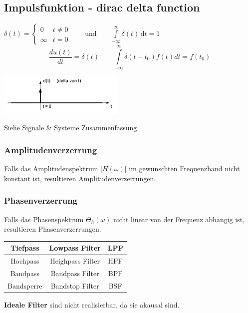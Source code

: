 \subsection{Impulsfunktion - dirac delta function}
	\begin{minipage}{10cm}
		$\delta (t)=\begin{cases} 0 & t\ne 0\\\infty & t=0\end{cases} \qquad
		\text{und} \qquad \int\limits_{-\infty}^\infty \delta(t) \, \mathrm dt = 1 $\\
		$$\frac{du(t)}{dt}=\delta(t) \qquad
		\int\limits_{-\infty}^{\infty}\delta(t-t_0)f(t)dt=f(t_0)$$
	\end{minipage}
	\begin{minipage}{8cm}
		\includegraphics[width=6cm]{bilder/diracimpulse.png}
	\end{minipage}


Siehe Signale \& Systeme Zusammenfassung.\\


\subsubsection{Amplitudenverzerrung}
Falls das Amplitudenspektrum $|H(\omega)|$ im gewünschten Frequenzband nicht konstant ist,
resultieren Amplitudenverzerrungen.

\subsubsection{Phasenverzerrung}
Falls das Phasenspektrum $\Theta_h (\omega)$ nicht linear von der Frequenz abhängig ist, resultieren
Phasenverzerrungen.\\



\begin{multicols}{2}
\begin{center}
\begin{tabular}{|c|c|c|}
\hline
Tiefpass & Lowpass Filter & LPF \\
\hline
Hochpass & Heighpass Filter & HPF \\
\hline
Bandpass & Bandpass Filter & BPF \\
\hline
Bandsperre & Bandstop Filter & BSF \\
\hline
\end{tabular}
\end{center}
\columnbreak

\textbf{Ideale Filter} sind nicht realisierbar, da sie akausal sind.
\end{multicols}

